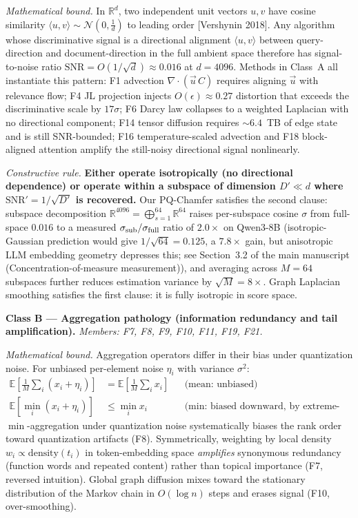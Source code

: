 \documentclass[review,1p,11pt]{elsarticle}
\newcommand{\R}{\mathbb{R}}
\begin{document}
\noindent\emph{Mathematical bound.} In $\mathbb{R}^d$, two independent unit vectors $u, v$ have cosine similarity $\langle u, v\rangle \sim \mathcal{N}\!\left(0, \tfrac{1}{d}\right)$ to leading order [Vershynin 2018]. Any algorithm whose discriminative signal is a directional alignment $\langle u, v\rangle$ between query-direction and document-direction in the full ambient space therefore has signal-to-noise ratio $\mathrm{SNR} = O(1/\sqrt{d}) \approx 0.016$ at $d=4096$. Methods in Class~A all instantiate this pattern: F1 advection $\nabla\!\cdot\!(\vec{u}\, C)$ requires aligning $\vec{u}$ with relevance flow; F4 JL projection injects $O(\epsilon) \approx 0.27$ distortion that exceeds the discriminative scale by $17\sigma$; F6 Darcy law collapses to a weighted Laplacian with no directional component; F14 tensor diffusion requires $\sim 6.4$~TB of edge state and is still SNR-bounded; F16 temperature-scaled advection and F18 block-aligned attention amplify the still-noisy directional signal nonlinearly.

\noindent\emph{Constructive rule.} \textbf{Either operate isotropically (no directional dependence) or operate within a subspace of dimension $D' \ll d$ where $\mathrm{SNR}' = 1/\sqrt{D'}$ is recovered.} Our PQ-Chamfer satisfies the second clause: subspace decomposition $\R^{4096} = \bigoplus_{s=1}^{64}\R^{64}$ raises per-subspace cosine $\sigma$ from full-space $0.016$ to a measured $\sigma_{\rm sub}/\sigma_{\rm full}$ ratio of $2.0\times$ on Qwen3-8B (isotropic-Gaussian prediction would give $1/\sqrt{64} = 0.125$, a $7.8\times$ gain, but anisotropic LLM embedding geometry depresses this; see Section~3.2 of the main manuscript (Concentration-of-measure measurement)), and averaging across $M=64$ subspaces further reduces estimation variance by $\sqrt{M} = 8\times$. Graph Laplacian smoothing satisfies the first clause: it is fully isotropic in score space.

\textbf{Class B --- Aggregation pathology (information redundancy and tail amplification).} \emph{Members: F7, F8, F9, F10, F11, F19, F21.}

\noindent\emph{Mathematical bound.} Aggregation operators differ in their bias under quantization noise. For unbiased per-element noise $\eta_i$ with variance $\sigma^2$:
\begin{align*}
\mathbb{E}\!\left[\frac{1}{M}\sum_i (x_i + \eta_i)\right] &= \mathbb{E}\!\left[\frac{1}{M}\sum_i x_i\right] && \text{(mean: unbiased)} \\
\mathbb{E}\!\left[\min_i (x_i + \eta_i)\right] &\le \min_i x_i && \text{(min: biased downward, by extreme-value statistics)}
\end{align*}
$\min$-aggregation under quantization noise systematically biases the rank order toward quantization artifacts (F8). Symmetrically, weighting by local density $w_i \propto \mathrm{density}(t_i)$ in token-embedding space \emph{amplifies} synonymous redundancy (function words and repeated content) rather than topical importance (F7, reversed intuition). Global graph diffusion mixes toward the stationary distribution of the Markov chain in $O(\log n)$ steps and erases signal (F10, over-smoothing).
\end{document}
